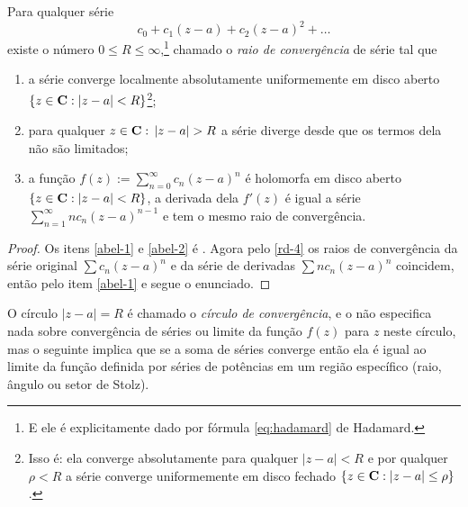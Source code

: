 \begin{teorema}[Abel]
\label{t:abel}
Para qualquer série
\[ c_0 + c_1 (z-a) + c_2 (z-a)^2 + \dots \]
existe o número $0\leq R \leq \infty$,\footnote{
E ele é explicitamente dado por fórmula \eqref{eq:hadamard} de Hadamard.}
chamado o \emph{raio de convergência} de série tal que
\begin{enumerate}
\item \label{abel-1} a série converge localmente absolutamente uniformemente 
em disco aberto $\{z\in \mathbf{C} : |z-a|<R\}$\footnote{Isso é:
ela converge absolutamente para qualquer $|z-a|<R$
e por qualquer $\rho < R$ a série converge uniformemente em disco fechado
$\{z\in\mathbf{C} : |z-a| \leq \rho \}$.};
\item \label{abel-2} para qualquer $z\in\mathbf{C} :\, |z-a| > R$ a série diverge desde que os termos dela não são limitados;
\item \label{abel-3} a função $f(z) := \sum_{n=0}^\infty c_n (z-a)^n$
é holomorfa em disco aberto $\{z\in \mathbf{C} : |z-a| < R\}$,
a derivada dela $f'(z)$ é igual a série $\sum_{n=1}^\infty n c_n (z-a)^{n-1}$
e tem o mesmo raio de convergência.
\end{enumerate}
\end{teorema}
\begin{proof}
Os itens \eqref{abel-1} e \eqref{abel-2} é .
Agora pelo \eqref{rd-4} os raios de convergência
da série original $\sum  c_n (z-a)^n$ e da série de derivadas $\sum n c_n (z-a)^n$ coincidem,
então pelo item \eqref{abel-1} e  segue o enunciado.
\end{proof}

O círculo $|z-a| = R$ é chamado o \emph{círculo de convergência}, e o  não especifica
nada sobre convergência de séries ou limite da função $f(z)$ para $z$ neste círculo,
mas o seguinte  implica que se a soma de séries converge
então ela é igual ao limite da função definida por séries de potências
em um região específico (raio, ângulo ou setor de Stolz).

